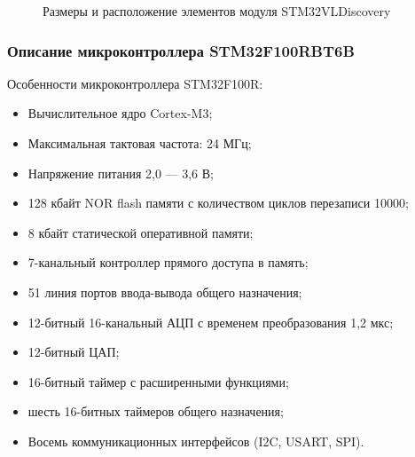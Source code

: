         \begin{figure}
            \caption{Размеры и расположение элементов модуля STM32VLDiscovery}
            \label{fig:stm32vldiscovery}
        \end{figure}       

    \subsubsection{Описание микроконтроллера STM32F100RBT6B}
        Особенности микроконтроллера STM32F100R:
        \begin{itemize}
            \item Вычислительное ядро Cortex-M3;
            \item Максимальная тактовая частота: 24 МГц;
            \item Напряжение питания 2,0 — 3,6 В;
            \item 128 кбайт NOR flash памяти с количеством циклов перезаписи 10000;
            \item 8 кбайт статической оперативной памяти;
            \item 7-канальный контроллер прямого доступа в память;
            \item 51 линия портов ввода-вывода общего назначения;
            \item 12-битный 16-канальный АЦП с временем преобразования 1,2 мкс;
            \item 12-битный ЦАП;
            \item 16-битный таймер с расширенными функциями;
            \item шесть 16-битных таймеров общего назначения;
            \item Восемь коммуникационных интерфейсов (I2C, USART, SPI).
        \end{itemize}

